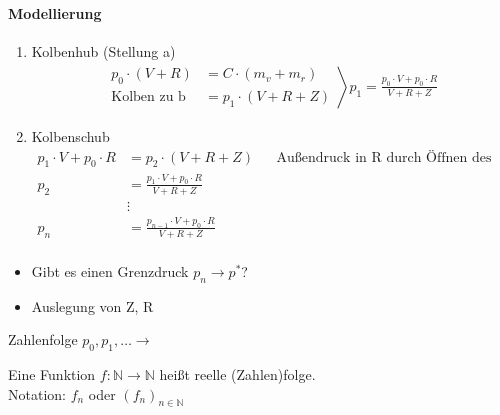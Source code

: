 \begin{example}[Evakuierungspumpe]
\paragraph{Modellierung}
\begin{enumerate}
	\item Kolbenhub (Stellung a)
	\begin{align*} \left.
		\begin{aligned}
			p_0 \cdot (V + R) &= C \cdot (m_v + m_r) \\
			\text{Kolben zu b} &= p_1 \cdot (V + R + Z)
		\end{aligned} \right\rangle
		p_1 = \frac{p_0 \cdot V + p_0 \cdot R}{V + R + Z}
	\end{align*}
	\item Kolbenschub
	\begin{align*}
	p_1 \cdot V + p_0 \cdot R &= p_2 \cdot (V + R + Z) && \text{Außendruck in R durch Öffnen des Ventils 1} \\
	p_2 &= \frac{p_1 \cdot V + p_0 \cdot R}{V + R + Z} \\
	&\vdots \\
	p_n &= \frac{p_{n-1} \cdot V + p_0 \cdot R}{V + R + Z} \\
	\end{align*}
\end{enumerate}
\begin{itemize} 
  \item Gibt es einen Grenzdruck $p_n \rightarrow p^*$?
  \item Auslegung von Z, R
\end{itemize}
Zahlenfolge $p_0, p_1, \ldots \rightarrow$

\end{example}

\begin{definition}[Zahlenfolge]
Eine Funktion $f: \mathbb N \rightarrow \mathbb N$ heißt reelle (Zahlen)folge.\\
Notation: $f_n$ oder $(f_n)_{n \in \mathbb N}$
\end{definition}

